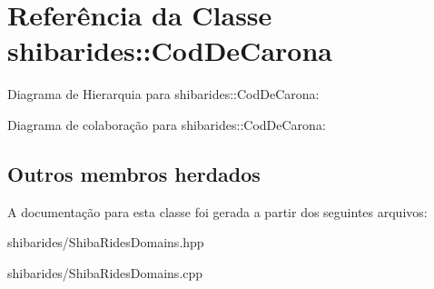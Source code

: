 \hypertarget{classshibarides_1_1CodDeCarona}{}\section{Referência da Classe shibarides\+:\+:Cod\+De\+Carona}
\label{classshibarides_1_1CodDeCarona}


Diagrama de Hierarquia para shibarides\+:\+:Cod\+De\+Carona\+:


Diagrama de colaboração para shibarides\+:\+:Cod\+De\+Carona\+:
\subsection*{Outros membros herdados}


A documentação para esta classe foi gerada a partir dos seguintes arquivos\+:\begin{DoxyCompactItemize}
\item 
shibarides/Shiba\+Rides\+Domains.\+hpp\item 
shibarides/Shiba\+Rides\+Domains.\+cpp\end{DoxyCompactItemize}
